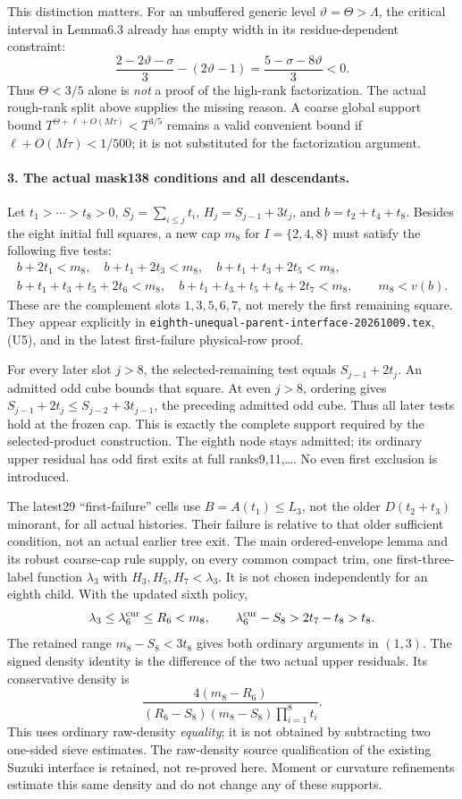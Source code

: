 This distinction matters. For an unbuffered generic level
$\vartheta=\Theta>\Lambda$, the critical interval in Lemma6.3
already has empty width in its residue-dependent constraint:
\[
 \frac{2-2\vartheta-\sigma}{3}-(2\vartheta-1)
   =\frac{5-\sigma-8\vartheta}{3}<0.
\]
Thus $\Theta<3/5$ alone is \emph{not} a proof of the high-rank
factorization. The actual rough-rank split above supplies the
missing reason. A coarse global support bound
$T^{\Theta+\ell+O(M\tau)}<T^{3/5}$ remains a valid convenient
bound if $\ell+O(M\tau)<1/500$; it is not substituted for the
factorization argument.

\paragraph{3. The actual mask138 conditions and all descendants.}
Let $t_1>\cdots>t_8>0$, $S_j=\sum_{i\le j}t_i$,
$H_j=S_{j-1}+3t_j$, and $b=t_2+t_4+t_8$.
Besides the eight initial full squares, a new cap $m_8$ for
$I=\{2,4,8\}$ must satisfy the following five tests:
\begin{gather*}
 b+2t_1<m_8,\quad b+t_1+2t_3<m_8,\quad
 b+t_1+t_3+2t_5<m_8,\\
 b+t_1+t_3+t_5+2t_6<m_8,\quad
 b+t_1+t_3+t_5+t_6+2t_7<m_8,\qquad m_8<v(b).
\end{gather*}
These are the complement slots $1,3,5,6,7$, not merely the first
remaining square. They appear explicitly in
\texttt{eighth-unequal-parent-interface-20261009.tex}, (U5), and in
the latest first-failure physical-row proof.

For every later slot $j>8$, the selected-remaining test equals
$S_{j-1}+2t_j$. An admitted odd cube bounds that square. At even
$j>8$, ordering gives
$S_{j-1}+2t_j\le S_{j-2}+3t_{j-1}$, the preceding admitted odd
cube. Thus all later tests hold at the frozen cap. This is exactly
the complete support required by the selected-product construction.
The eighth node stays admitted; its ordinary upper residual has
odd first exits at full ranks9,11,\ldots. No even first exclusion
is introduced.

The latest29 ``first-failure'' cells use $B=A(t_1)\le L_3$, not
the older $D(t_2+t_3)$ minorant, for all actual histories.
Their failure is relative to that older sufficient condition,
not an actual earlier tree exit. The main ordered-envelope lemma
and its robust coarse-cap rule supply, on every common compact
trim, one first-three-label function $\lambda_3$ with
$H_3,H_5,H_7<\lambda_3$. It is not chosen independently for an
eighth child. With the updated sixth policy,
\[
 \lambda_3\le\lambda_6^{\rm cur}\le R_6<m_8,
 \qquad
 \lambda_6^{\rm cur}-S_8>2t_7-t_8>t_8.
\]
The retained range $m_8-S_8<3t_8$ gives both ordinary arguments
in $(1,3)$. The signed density identity is the difference of the
two actual upper residuals. Its conservative density is
\[
 \frac{4(m_8-R_6)}{(R_6-S_8)(m_8-S_8)\prod_{i=1}^8t_i}.
\]
This uses ordinary raw-density \emph{equality}; it is not obtained
by subtracting two one-sided sieve estimates. The raw-density
source qualification of the existing Suzuki interface is retained,
not re-proved here. Moment or curvature refinements estimate this
same density and do not change any of these supports.

